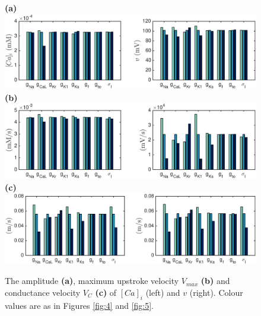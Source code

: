\documentclass[12pt,a4paper]{article}
\begin{document}
\begin{figure}
 \textbf{(a)}  \includegraphics[trim=1cm 0cm 2cm 0cm, clip=true, width=1\linewidth]{amplitude} 
 \textbf{(b)}  \includegraphics[trim=1cm 0cm 2cm 0cm, clip=true, width=1\linewidth]{v_max} 
 \textbf{(c)}   \includegraphics[trim=1cm 0cm 2cm 0cm, clip=true, width=1\linewidth]{v_c} 
    \caption{The amplitude \textbf{(a)}, maximum upstroke velocity $V_{max}$ \textbf{(b)} and conductance velocity $V_{C}$ \textbf{(c)} of $[Ca]_i$ (left) and $v$ (right).  Colour values are as in Figures \ref{fig:4} and \ref{fig:5}.}
    \label{fig:6}
\end{figure}
%
\end{document}
